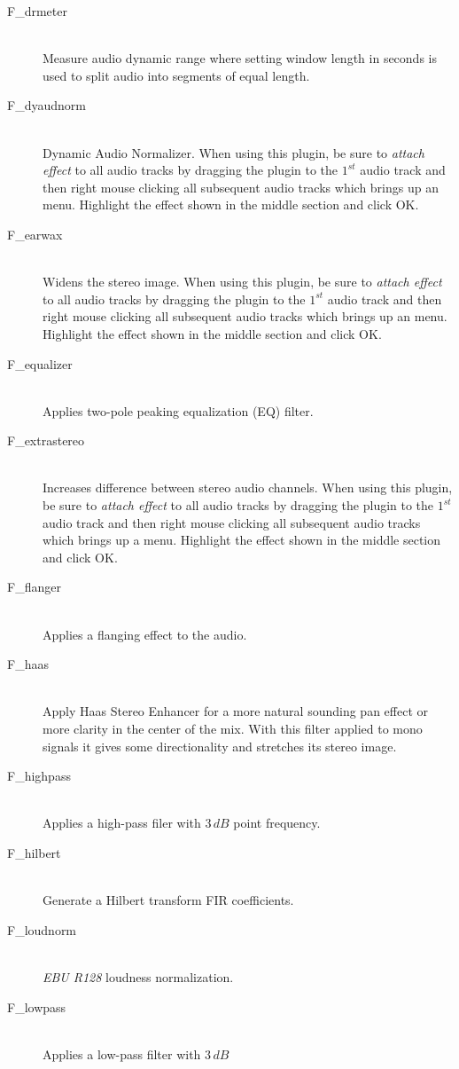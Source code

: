 \begin{description}
\item [F\_drmeter]~\\Measure audio dynamic range where setting
  window length in seconds is used to split audio into segments of
  equal length.
\item [F\_dyaudnorm]~\\Dynamic Audio Normalizer. When using
  this plugin, be sure to \textit{attach effect} to all audio tracks
  by dragging the plugin to the $1^{st}$ audio track and then right
  mouse clicking all subsequent audio tracks which brings up an
  menu. Highlight the effect shown in the middle section and click OK.
\item [F\_earwax]~\\Widens the stereo image. When using this
  plugin, be sure to \textit{attach effect} to all audio tracks by
  dragging the plugin to the $1^{st}$ audio track and then right mouse
  clicking all subsequent audio tracks which brings up an
  menu. Highlight the effect shown in the middle section and click OK.
\item [F\_equalizer]~\\Applies two-pole peaking equalization
  (EQ) filter.
\item [F\_extrastereo]~\\Increases difference between stereo
  audio channels. When using this plugin, be sure to \textit{attach
    effect} to all audio tracks by dragging the plugin to the $1^{st}$
  audio track and then right mouse clicking all subsequent audio
  tracks which brings up a menu. Highlight the effect shown in the
  middle section and click OK.
\item [F\_flanger]~\\Applies a flanging effect to the audio.
\item [F\_haas]~\\Apply Haas Stereo Enhancer for a more
  natural sounding pan effect or more clarity in the center of the
  mix. With this filter applied to mono signals it gives some
  directionality and stretches its stereo image.
\item [F\_highpass]~\\Applies a high-pass filer with $3\,dB$
  point frequency.
\item [F\_hilbert]~\\Generate a Hilbert transform FIR
  coefficients.
\item [F\_loudnorm]~\\\textit{EBU R128} loudness
  normalization.
\item [F\_lowpass]~\\Applies a low-pass filter with $3\,dB$

\end{description}
